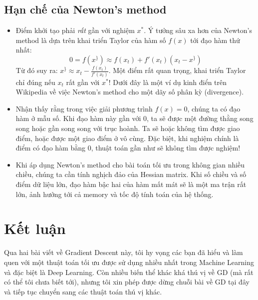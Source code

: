 \subsection{Hạn chế của Newton's method}
\begin{itemize}
    \item Điểm khởi tạo phải \textit{rất} gần với nghiệm $x^*$. 
Ý tưởng sâu xa hơn của Newton's method là dựa trên khai triển Taylor của hàm số $f(x)$ tới đạo hàm thứ nhất: 
\begin{equation*} 
0 = f(x^\}) \approx f(x_t) + f'(x_t)(x_t - x^\}) 
\end{equation*} 
Từ đó suy ra: $x^\} \approx x_t - \frac{f(x_t)}{f'(x_t)}$.  
Một điểm rất quan trọng, khai triển Taylor chỉ đúng nếu $x_t$ rất gần với $x^*$! 
Dưới đây là một ví dụ kinh điển trên Wikipedia về việc Newton's method cho một dãy số phân kỳ (divergence). 


\item Nhận thấy rằng trong việc giải phương trình $f(x) = 0$, chúng ta có đạo hàm ở mẫu số. Khi đạo hàm này gần với 0, ta sẽ được một đường thằng song song hoặc gần song song với trục hoành. Ta sẽ hoặc không tìm được giao điểm, hoặc được một giao điểm ở vô cùng. Đặc biệt, khi nghiệm chính là điểm có đạo hàm bằng 0, thuật toán gần như sẽ không tìm được nghiệm! 

 \item Khi áp dụng Newton's method cho bài toán tối ưu trong không gian nhiều chiều, chúng ta cần tính nghịch đảo của Hessian matrix. Khi số chiều và số điểm dữ liệu lớn, đạo hàm bậc hai của hàm mất mát sẽ là một ma trận rất lớn, ảnh hưởng tới cả memory và tốc độ tính toán của hệ thống. 

\end{itemize}
 
\section{Kết luận}
Qua hai bài viết về Gradient Descent này, tôi hy vọng các bạn đã hiểu và làm quen với một thuật toán tối ưu được sử dụng nhiều nhất trong Machine Learning và đặc biệt là Deep Learning. Còn nhiều biến thể khác khá thú vị về GD (mà rất có thể tôi chưa biết tới), nhưng tôi xin phép được dừng chuỗi bài về GD tại đây và tiếp tục chuyển sang các thuật toán thú vị khác.  
 
